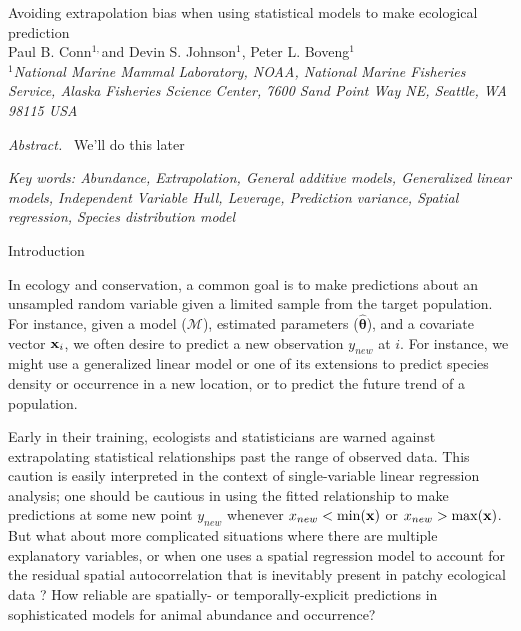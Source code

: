 \documentclass[12pt,english]{article}
\begin{document}
\begin{spacing}{1.9}

\begin{center}
Avoiding extrapolation bias when using statistical models to make ecological prediction
\bigskip\\
\normalsize
{\sc Paul B. Conn$^{1,}$\footnotemark[2] and
Devin S. Johnson$^1$, Peter L. Boveng$^1$ }\smallskip\\
$^1${\em National Marine Mammal Laboratory, NOAA, National Marine Fisheries Service,
Alaska Fisheries Science Center, 7600 Sand Point Way NE, Seattle,
WA 98115 USA }\\ \medskip
\end{center}


\raggedright \setlength{\parindent}{0.3in}
{}
 \linenumbers


{\em Abstract.\ } We'll do this later



{\em Key words: Abundance, Extrapolation, General additive models, Generalized linear models, Independent Variable Hull, Leverage, Prediction variance, Spatial regression, Species distribution model}

\centerline{\sc Introduction}


In ecology and conservation, a common goal is to make predictions about an unsampled random variable given a limited sample from the target population.  For instance, given a model ($\mathcal{M}$), estimated parameters ($\hat{\boldsymbol{\theta}}$), and a covariate vector ${\bf x}_i$, we often desire to predict a new observation $y_{new}$ at $i$.  For instance, we might use a generalized linear model \citep{McCullaghNelder1989} or one of its extensions to predict species density or occurrence in a new location, or to predict the future trend of a population.

Early in their training, ecologists and statisticians are warned against extrapolating statistical relationships
past the range of observed data.  This caution is easily interpreted in the context of single-variable linear regression analysis; one should be cautious in using the fitted relationship to make predictions at some new point $y_{new}$ whenever $x_{new} < \min({\bf x})$ or $x_{new} > \max({\bf x})$.  But what about more complicated situations
where there are multiple explanatory variables, or when one uses a spatial regression model to account for the residual spatial autocorrelation that is inevitably present in patchy ecological data \citep{LichsteinEtAl2002}?  How reliable are spatially- or temporally-explicit predictions in sophisticated models for animal abundance and occurrence?


\end{spacing}
\end{document}
